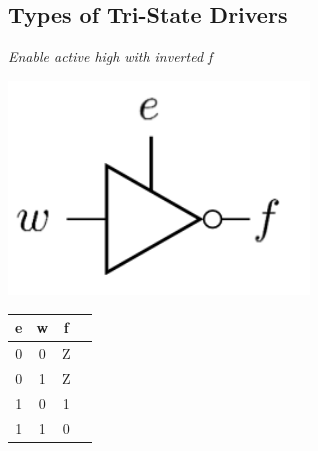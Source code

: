 \documentclass[12pt,openany, tikz,border=10pt]{book}
\begin{document}
\subsection{Types of Tri-State Drivers}


	\begin{minipage}{0.3\textwidth}
	\begin{center}
		\textit{Enable active high} \newline \textit{with inverted f}
	\end{center}
		\centering
	\includegraphics[width=0.6\textwidth]{circuits/11.2.1.png} %
	
		\begin{tabular}{|c|c|c|c|}
			\hline
			e & w & f \\
			\hline
			0 & 0 & Z  \\
			0 & 1 & Z  \\
			1 & 0 & 1  \\
			1 & 1 & 0  \\
			\hline
		\end{tabular}
		\hfill
	\end{minipage}
\end{document}
